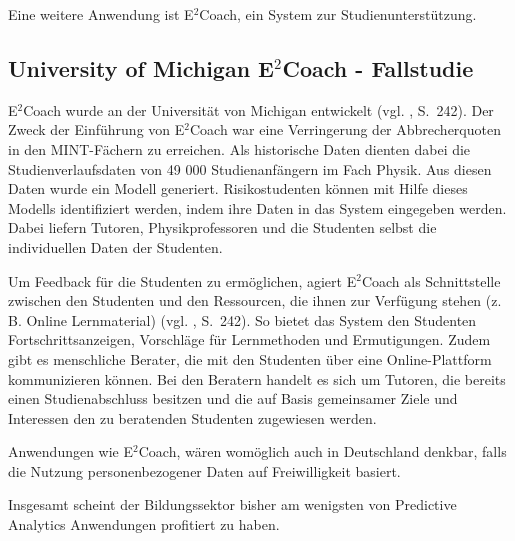 Eine weitere Anwendung ist E$^2$Coach, ein System zur Studienunterstützung.

\subsection{University of Michigan E$^2$Coach - Fallstudie}

E$^2$Coach wurde an der Universität von Michigan entwickelt (vgl. \cite{Mattingly}, S.~242).
Der Zweck der Einführung von E$^2$Coach war eine Verringerung der Abbrecherquoten in den
MINT-Fächern zu erreichen. Als historische Daten dienten dabei die Studienverlaufsdaten von
49 000 Studienanfängern im Fach Physik. Aus diesen Daten wurde ein Modell generiert.
Risikostudenten können mit Hilfe dieses Modells identifiziert werden, indem ihre Daten in das
System eingegeben werden. Dabei liefern Tutoren, Physikprofessoren und die Studenten selbst
die individuellen Daten der Studenten.

Um Feedback für die Studenten zu ermöglichen, agiert E$^2$Coach als Schnittstelle zwischen
den Studenten und den Ressourcen, die ihnen zur Verfügung stehen (z. B. Online Lernmaterial) (vgl. \cite{Mattingly}, S.~242).
So bietet das System den Studenten Fortschrittsanzeigen, Vorschläge für Lernmethoden und Ermutigungen.
Zudem gibt es menschliche Berater, die mit den Studenten über eine Online-Plattform kommunizieren können.
Bei den Beratern handelt es sich um Tutoren, die bereits einen Studienabschluss besitzen und die auf Basis
gemeinsamer Ziele und Interessen den zu beratenden Studenten zugewiesen werden.

Anwendungen wie E$^2$Coach, wären womöglich auch in Deutschland denkbar, falls die Nutzung personenbezogener
Daten auf Freiwilligkeit basiert.

Insgesamt scheint der Bildungssektor bisher am wenigsten von
Predictive Analytics Anwendungen profitiert zu haben.

